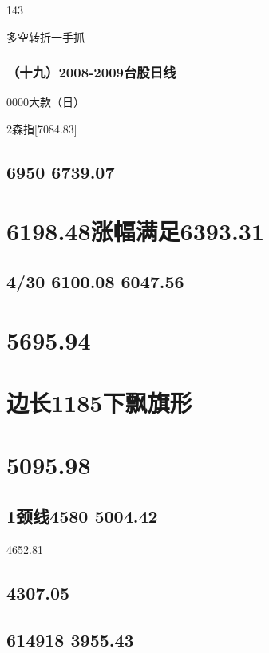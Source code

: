 \documentclass{article}
\begin{document}
143

\clearpage

多空转折一手抓

\subsubsection{（十九）2008-2009台股日线}

0000大款（日）

2森指[7084.83]

\subsection{6950 6739.07}

\section{6198.48涨幅满足6393.31}

\subsection{4/30 6100.08 6047.56}

\section{5695.94}

\section{边长1185下飘旗形}

\section{5095.98}

\subsection{1颈线4580 5004.42}

4652.81

\subsection{4307.05}

\subsection{614918 3955.43}
\end{document}
